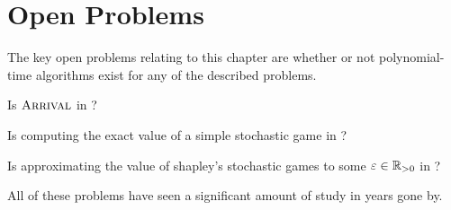 \section{Open Problems}
The key open problems relating to this chapter are whether or not polynomial-time
algorithms exist for any of the described problems.
\begin{open}
  Is $\textsc{Arrival}$ in \PClass?
\end{open}
\begin{open}
  Is computing the exact value of a simple stochastic game in \PClass?
\end{open}
\begin{open}
  Is approximating the value of shapley's stochastic games to some $\varepsilon \in \mathbb{R}_{> 0}$
  in \PClass?
\end{open}
All of these problems have seen a significant amount of study in years gone by.
